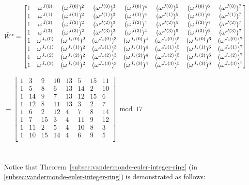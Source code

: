 $\tilde{W}^* = \begin{bmatrix}
1 & \omega^{J(0)} & (\omega^{J(0)})^2 & (\omega^{J(0)})^3 & (\omega^{J(0)})^4 & (\omega^{J(0)})^5 & (\omega^{J(0)})^6 & (\omega^{J(0)})^7\\
1 & \omega^{J(1)} & (\omega^{J(1)})^2 & (\omega^{J(1)})^3 & (\omega^{J(1)})^4& (\omega^{J(1)})^5& (\omega^{J(1)})^6& (\omega^{J(1)})^7\\
1 & \omega^{J(2)} & (\omega^{J(2)})^2 & (\omega^{J(2)})^3 & (\omega^{J(2)})^4 & (\omega^{J(2)})^5 & (\omega^{J(2)})^6 & (\omega^{J(2)})^7\\
1 & \omega^{J(3)} & (\omega^{J(3)})^2 & (\omega^{J(3)})^3 & (\omega^{J(3)})^4& (\omega^{J(3)})^5& (\omega^{J(3)})^6& (\omega^{J(3)})^7\\
1 & \omega^{J_*(0)} & (\omega^{J_*(0)})^2 & (\omega^{J_*(0)})^3 & (\omega^{J_*(0)})^4 & (\omega^{J_*(0)})^5 & (\omega^{J_*(0)})^6 & (\omega^{J_*(0)})^7\\
1 & \omega^{J_*(1)} & (\omega^{J_*(1)})^2 & (\omega^{J_*(1)})^3 & (\omega^{J_*(1)})^4& (\omega^{J_*(1)})^5& (\omega^{J_*(1)})^6& (\omega^{J_*(1)})^7\\
1 & \omega^{J_*(2)} & (\omega^{J_*(2)})^2 & (\omega^{J_*(2)})^3 & (\omega^{J_*(2)})^4 & (\omega^{J_*(2)})^5 & (\omega^{J_*(2)})^6 & (\omega^{J_*(2)})^7\\
1 & \omega^{J_*(3)} & (\omega^{J_*(3)})^2 & (\omega^{J_*(3)})^3 & (\omega^{J_*(3)})^4& (\omega^{J_*(3)})^5& (\omega^{J_*(3)})^6& (\omega^{J_*(3)})^7\\
\end{bmatrix}$

$ \equiv \begin{bmatrix}
1&3&9&10&13&5&15&11\\
1&5&8&6&13&14&2&10\\
1&14&9&7&13&12&15&6\\
1&12&8&11&13&3&2&7\\
1&6&2&12&4&7&8&14\\
1&7&15&3&4&11&9&12\\
1&11&2&5&4&10&8&3\\
1&10&15&14&4&6&9&5\\
\end{bmatrix}  \bmod{17}$

$ $

$ $

Notice that Theorem~\ref*{subsec:vandermonde-euler-integer-ring} (in \autoref{subsec:vandermonde-euler-integer-ring}) is demonstrated as follows:

